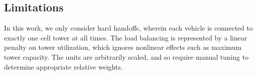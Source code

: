 \documentclass[twocolumn,10pt]{article}
\begin{document}
\subsection{Limitations}
  
In this work, we only consider hard handoffs, wherein each vehicle is connected to exactly one cell tower at all times.  The load balancing is represented by a linear penalty on tower utilization, which ignores nonlinear effects such as maximum tower capacity.  The units are arbitrarily scaled, and so require manual tuning to determine appropriate relative weights.
\end{document}
